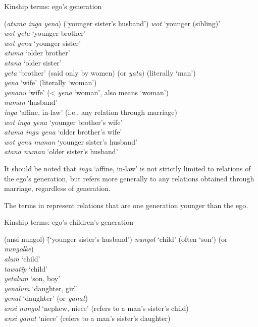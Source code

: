 \ea%
    \label{ex:sem:26a}
          Kinship terms: ego’s generation
\begin{tabbing}
      {(\textit{atuma inga yena})} \= {(‘younger sister’s husband’)}\kill
    \textit{wot} \> ‘younger (sibling)’\\
    \textit{wot yeta} \> ‘younger brother’\\
    \textit{wot yena} \> ‘younger sister’\\
    \textit{atuma} \> ‘older brother’\\
    \textit{atana} \> ‘older sister’\\
    \textit{yeta} \> ‘brother’ (said only by women) (or \textit{yata}) (literally ‘man’)\\
    \textit{yena} \> ‘wife’ (literally ‘woman’)\\
    \textit{yenanu} \> ‘wife’ (< \textit{yena} ‘woman’, also means ‘woman’)\\
    \textit{numan} \> ‘husband’\\
    \textit{inga} \> ‘affine, in-law’ (i.e., any relation through marriage)\\
    \textit{wot inga yena} \> ‘younger brother’s wife’\\
    \textit{atuma inga yena} \> ‘older brother’s wife’\\
    \textit{wot yena numan} \> ‘younger sister’s husband’\\
    \textit{atana numan} \> ‘older sister’s husband’
\end{tabbing}
\z

It should be noted that \textit{inga} ‘affine, in-law’ is not strictly limited to relations of the ego’s generation, but refers more generally to any relations obtained through marriage, regardless of generation.

The terms in  represent relations that are one generation younger than the ego.

\ea%
    \label{ex:sem:26b}
          Kinship terms: ego’s children’s generation
\begin{tabbing}
{(ansi nungol)} \= {(‘younger sister’s husband’)}\kill
    \textit{nungol} \> ‘child’ (often ‘son’) (or \textit{nungolke})\\
    \textit{alum} \> ‘child’\\
    \textit{tawatïp} \> ‘child’\\
    \textit{yetalum} \> ‘son, boy’\\
    \textit{yenalum} \> ‘daughter, girl’\\
    \textit{yenat} \> ‘daughter’ (or \textit{yanat})\\
    \textit{ansi nungol}  \> ‘nephew, niece’ (refers to a man’s sister’s child)\\
    \textit{ansi yanat} \> ‘niece’ (refers to a man’s sister’s daughter)
\end{tabbing}
\z


